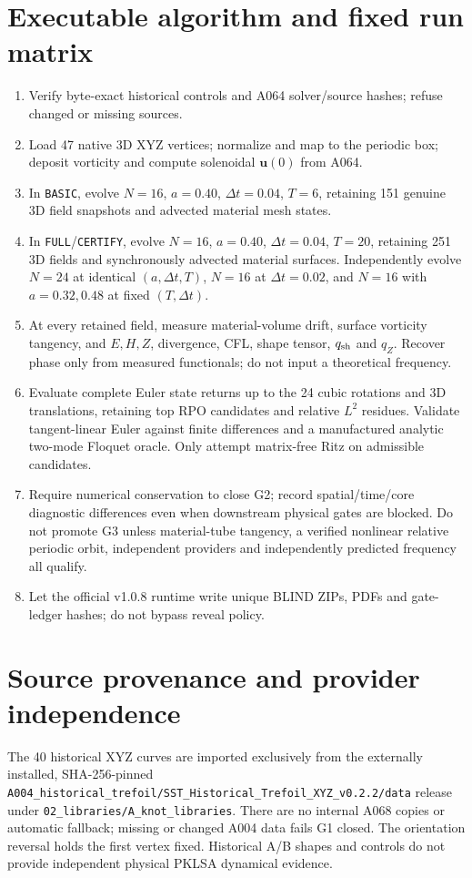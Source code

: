 \documentclass[11pt,a4paper]{article}
\begin{document}
\section{Executable algorithm and fixed run matrix}
\begin{enumerate}
\item Verify byte-exact historical controls and A064 solver/source hashes; refuse changed or missing sources.
\item Load 47 native 3D XYZ vertices; normalize and map to the periodic box; deposit vorticity and compute solenoidal $\mathbf u(0)$ from A064.
\item In \texttt{BASIC}, evolve $N=16$, $a=0.40$, $\Delta t=0.04$, $T=6$, retaining 151 genuine 3D field snapshots and advected material mesh states.
\item In \texttt{FULL}/\texttt{CERTIFY}, evolve $N=16$, $a=0.40$, $\Delta t=0.04$, $T=20$, retaining 251 3D fields and synchronously advected material surfaces. Independently evolve $N=24$ at identical $(a,\Delta t,T)$, $N=16$ at $\Delta t=0.02$, and $N=16$ with $a=0.32,0.48$ at fixed $(T,\Delta t)$.
\item At every retained field, measure material-volume drift, surface vorticity tangency, and $E,H,Z$, divergence, CFL, shape tensor, $q_{\rm sh}$ and $q_Z$. Recover phase only from measured functionals; do not input a theoretical frequency.
\item Evaluate complete Euler state returns up to the 24 cubic rotations and 3D translations, retaining top RPO candidates and relative $L^2$ residues. Validate tangent-linear Euler against finite differences and a manufactured analytic two-mode Floquet oracle. Only attempt matrix-free Ritz on admissible candidates.\item Require numerical conservation to close G2; record spatial/time/core diagnostic differences even when downstream physical gates are blocked. Do not promote G3 unless material-tube tangency, a verified nonlinear relative periodic orbit, independent providers and independently predicted frequency all qualify.
\item Let the official v1.0.8 runtime write unique BLIND ZIPs, PDFs and gate-ledger hashes; do not bypass reveal policy.\end{enumerate}

\section{Source provenance and provider independence}
\noindent The 40 historical XYZ curves are imported exclusively from the externally installed, SHA-256-pinned \texttt{A004\_historical\_trefoil/SST\_Historical\_Trefoil\_XYZ\_v0.2.2/data} release under \texttt{02\_libraries/A\_knot\_libraries}. There are no internal A068 copies or automatic fallback; missing or changed A004 data fails G1 closed. The orientation reversal holds the first vertex fixed. Historical A/B shapes and controls do not provide independent physical PKLSA dynamical evidence.\par
\end{document}
